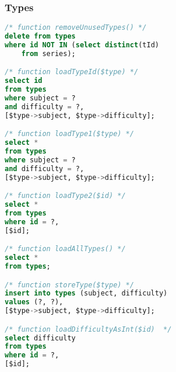 \subsubsection{Types}
\begin{lstlisting}[language=sql]
/* function removeUnusedTypes() */
delete from types
where id NOT IN (select distinct(tId)
    from series);

/* function loadTypeId($type) */
select id
from types
where subject = ?
and difficulty = ?,
[$type->subject, $type->difficulty];

/* function loadType1($type) */
select *
from types
where subject = ?
and difficulty = ?,
[$type->subject, $type->difficulty];

/* function loadType2($id) */
select *
from types
where id = ?,
[$id];

/* function loadAllTypes() */
select *
from types;

/* function storeType($type) */
insert into types (subject, difficulty)
values (?, ?),
[$type->subject, $type->difficulty];

/* function loadDifficultyAsInt($id)  */
select difficulty
from types
where id = ?,
[$id];

\end{lstlisting}
